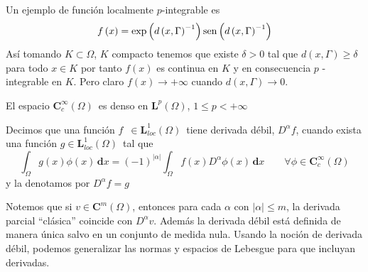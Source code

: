 Un ejemplo de función localmente $p$-integrable es
\[
f\left( x\right) =\exp \left( d\left( x,\Gamma \right) ^{-1}\right) \sen%
\left( d\left( x,\Gamma \right) ^{-1}\right)
\]
Así tomando $K\subset \Omega $, $K$ compacto tenemos que existe
$\delta >0$ tal que $d\left( x,\Gamma \right) \geqslant \delta $
para todo $x\in K$ por
tanto $f\left( x\right) $ es continua en $K$ y en consecuencia $p$%
-integrable en $K$. Pero claro $f\left( x\right) \rightarrow +\infty $
cuando $d\left( x,\Gamma \right) \rightarrow 0$.
\begin{teo}
	\label{CcdensoenL1}El espacio $\mathbf{C}_{c}^{\infty}\left( \Omega \right) $\ es
	denso en $\mathbf{L}^{p}\left( \Omega \right) $, $1\leq p<+\infty$
\end{teo}
\begin{defi}
	Decimos que una función $f$\ $\in \mathbf{L}_{loc}^{1}(\Omega )$\ tiene
	derivada débil, $D^{\alpha }f$, cuando exista una función $g\in
	\mathbf{L}_{loc}^{1}(\Omega )$\ tal que
	\[
	\int_{\Omega }g\left( x\right) \phi \left( x\right) \,\mathbf{d}%
	x=(-1)^{\left| \alpha \right| }\int_{\Omega }f\left( x\right)
	D^{\alpha }\phi \left( x\right) \,\mathbf{d}x\qquad \forall \phi \in
	\mathbf{C}_c^\infty(\Omega )
	\]
	y la denotamos por $D^{\alpha }f=g$
\end{defi}
Notemos que si $v\in \mathbf{C}^{m}(\Omega )$, entonces para cada $\alpha $
con $\left| \alpha \right| \leqslant m$, la derivada parcial ``clásica''
coincide con $D^{\alpha }v$. Además la derivada débil está
definida de manera única salvo en un conjunto de medida nula. Usando la
noción de derivada débil, podemos generalizar las normas y espacios
de Lebesgue para que incluyan derivadas.

